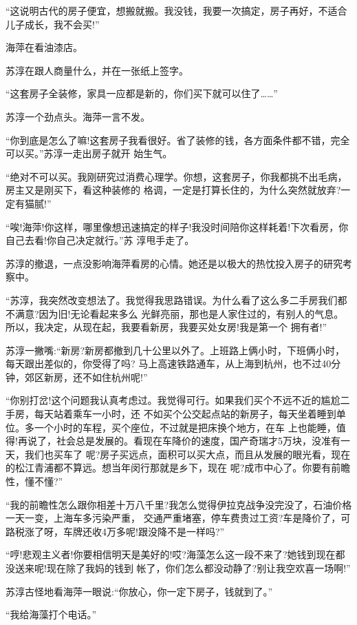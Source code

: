 \documentclass[11pt,a4paper,onecolumn]{article}
\begin{document}
``这说明古代的房子便宜，想搬就搬。我没钱，我要一次搞定，房子再好，不适合儿子成长，我不会买!''

海萍在看油漆店。

苏淳在跟人商量什么，并在一张纸上签字。

``这套房子全装修，家具一应都是新的，你们买下就可以住了……''

苏淳一个劲点头。海萍一言不发。

``你到底是怎么了嘛!这套房子我看很好。省了装修的钱，各方面条件都不错，完全可以买。''苏淳一走出房子就开
始生气。

``绝对不可以买。我刚研究过消费心理学。你想，这套房子，你我都挑不出毛病，房主又是刚买下，看这种装修的
格调，一定是打算长住的，为什么突然就放弃?一定有猫腻!''

``唉!海萍!你这样，哪里像想迅速搞定的样子!我没时间陪你这样耗着!下次看房，你自己去看!你自己决定就行。''苏
淳甩手走了。

苏淳的撤退，一点没影响海萍看房的心情。她还是以极大的热忱投入房子的研究考察中。

``苏淳，我突然改变想法了。我觉得我思路错误。为什么看了这么多二手房我们都不满意?因为旧!无论看起来多么
光鲜亮丽，那也是人家住过的，有别人的气息。所以，我决定，从现在起，我要看新房，我要买处女房!我是第一个
拥有者!''

苏淳一撇嘴:``新房?新房都撤到几十公里以外了。上班路上俩小时，下班俩小时，每天跟出差似的，你受得了吗?
马上高速铁路通车，从上海到杭州，也不过40分钟，郊区新房，还不如住杭州呢!''

``你别打岔!这个问题我认真考虑过。我觉得可行。如果我们买个不远不近的尴尬二手房，每天站着乘车一小时，还
不如买个公交起点站的新房子，每天坐着睡到单位。多一个小时的车程，买个座位，不过就是把床换个地方，在车
上也能睡，值得!再说了，社会总是发展的。看现在车降价的速度，国产奇瑞才5万块，没准有一天，我们也买车了
呢?房子买远点，面积可以买大点，而且从发展的眼光看，现在的松江青浦都不算远。想当年闵行那就是乡下，现在
呢?成市中心了。你要有前瞻性，懂不懂?''

``我的前瞻性怎么跟你相差十万八千里?我怎么觉得伊拉克战争没完没了，石油价格一天一变，上海车多污染严重，
交通严重堵塞，停车费贵过工资?车是降价了，可路税涨了呀，车牌还收4万多呢!跟没降不是一样吗?''

``哼!悲观主义者!你要相信明天是美好的!哎?海藻怎么这一段不来了?她钱到现在都没送来呢!现在除了我妈的钱到
帐了，你们怎么都没动静了?别让我空欢喜一场啊!''

苏淳古怪地看海萍一眼说:``你放心，你一定下房子，钱就到了。''

``我给海藻打个电话。''
\end{document}
